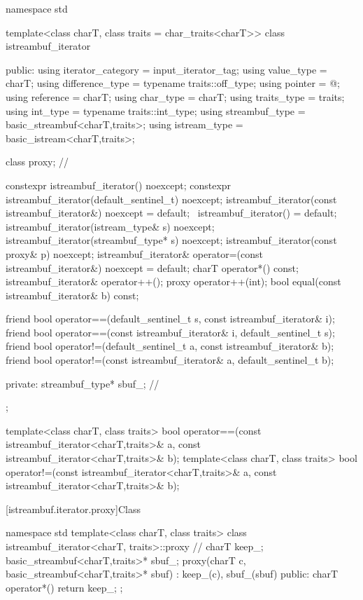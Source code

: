%
\begin{codeblock}
namespace std {
  template<class charT, class traits = char_traits<charT>>
  class istreambuf_iterator {
  public:
    using iterator_category = input_iterator_tag;
    using value_type        = charT;
    using difference_type   = typename traits::off_type;
    using pointer           = @\unspec@;
    using reference         = charT;
    using char_type         = charT;
    using traits_type       = traits;
    using int_type          = typename traits::int_type;
    using streambuf_type    = basic_streambuf<charT,traits>;
    using istream_type      = basic_istream<charT,traits>;

    class proxy;                          // \expos

    constexpr istreambuf_iterator() noexcept;
    constexpr istreambuf_iterator(default_sentinel_t) noexcept;
    istreambuf_iterator(const istreambuf_iterator&) noexcept = default;
    ~istreambuf_iterator() = default;
    istreambuf_iterator(istream_type& s) noexcept;
    istreambuf_iterator(streambuf_type* s) noexcept;
    istreambuf_iterator(const proxy& p) noexcept;
    istreambuf_iterator& operator=(const istreambuf_iterator&) noexcept = default;
    charT operator*() const;
    istreambuf_iterator& operator++();
    proxy operator++(int);
    bool equal(const istreambuf_iterator& b) const;

    friend bool operator==(default_sentinel_t s, const istreambuf_iterator& i);
    friend bool operator==(const istreambuf_iterator& i, default_sentinel_t s);
    friend bool operator!=(default_sentinel_t a, const istreambuf_iterator& b);
    friend bool operator!=(const istreambuf_iterator& a, default_sentinel_t b);

  private:
    streambuf_type* sbuf_;                // \expos
  };

  template<class charT, class traits>
    bool operator==(const istreambuf_iterator<charT,traits>& a,
            const istreambuf_iterator<charT,traits>& b);
  template<class charT, class traits>
    bool operator!=(const istreambuf_iterator<charT,traits>& a,
            const istreambuf_iterator<charT,traits>& b);
}
\end{codeblock}

[istreambuf.iterator.proxy]{Class }

%
\begin{codeblock}
namespace std {
  template<class charT, class traits>
  class istreambuf_iterator<charT, traits>::proxy { // \expos
    charT keep_;
    basic_streambuf<charT,traits>* sbuf_;
    proxy(charT c, basic_streambuf<charT,traits>* sbuf)
      : keep_(c), sbuf_(sbuf) { }
  public:
    charT operator*() { return keep_; }
  };
}
\end{codeblock}

